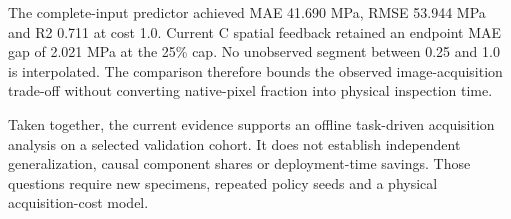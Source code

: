 The complete-input predictor achieved MAE 41.690 MPa, RMSE 53.944 MPa and R2 0.711 at cost 1.0. Current C spatial feedback retained an endpoint MAE gap of 2.021 MPa at the 25\% cap. No unobserved segment between 0.25 and 1.0 is interpolated. The comparison therefore bounds the observed image-acquisition trade-off without converting native-pixel fraction into physical inspection time.

Taken together, the current evidence supports an offline task-driven acquisition analysis on a selected validation cohort. It does not establish independent generalization, causal component shares or deployment-time savings. Those questions require new specimens, repeated policy seeds and a physical acquisition-cost model.
